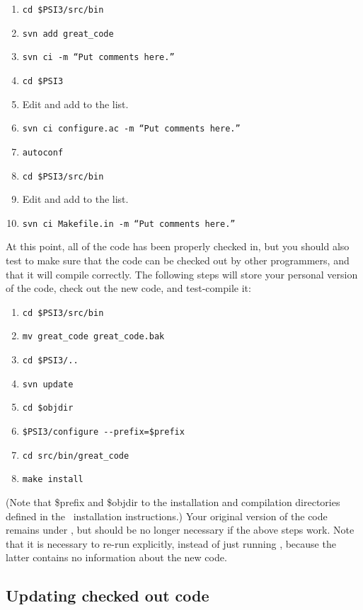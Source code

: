 \begin{enumerate}
\item {\tt cd \$PSI3/src/bin}
\item {\tt svn add great\_code}
\item {\tt svn ci -m ``Put comments here.''}
\item {\tt cd \$PSI3}
\item Edit  and add  to the list. 
\item {\tt svn ci configure.ac -m ``Put comments here.''}
\item {\tt autoconf} 
\item {\tt cd \$PSI3/src/bin} 
\item Edit  and add  to the list. 
\item {\tt svn ci Makefile.in -m ``Put comments here.''}
\end{enumerate}
At this point, all of the code has been properly checked in, but you
should also test to make sure that the code can be checked out by
other programmers, and that it will compile correctly. The following
steps will store your personal version of the code, check out the new
code, and test-compile it:
\begin{enumerate}
\item {\tt cd \$PSI3/src/bin}
\item {\tt mv great\_code great\_code.bak}
\item {\tt cd \$PSI3/..}
\item {\tt svn update}
\item {\tt cd \$objdir}
\item {\tt \$PSI3/configure -}{\tt -prefix=\$prefix}
\item {\tt cd src/bin/great\_code}
\item {\tt make install}
\end{enumerate}
(Note that \$prefix and \$objdir to the installation and compilation
 directories defined in the \PSIthree\ installation instructions.)
Your original version of the code remains under ,
but should be no longer necessary if the above steps work. Note that it is
necessary to re-run  explicitly, instead of just running
, because the latter contains no information about
the new code.

\subsection{Updating checked out code}

